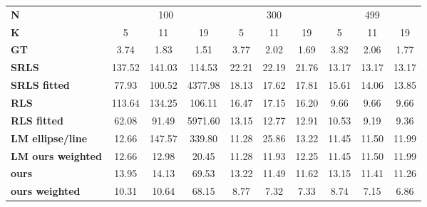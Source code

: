 \begin{tabular}{l|ccc|ccc|ccc|}
\toprule
\textbf{N} & \multicolumn{3}{c|}{100} & \multicolumn{3}{c|}{300} & \multicolumn{3}{c|}{499} \\
\textbf{K} &      5  &      11 &       19 &     5  &     11 &     19 &     5  &     11 &     19 \\
\midrule
\textbf{GT              } &    3.74 &    1.83 &     1.51 &   3.77 &   2.02 &   1.69 &   3.82 &   2.06 &   1.77 \\
\textbf{\midrule SRLS           } &  137.52 &  141.03 &   114.53 &  22.21 &  22.19 &  21.76 &  13.17 &  13.17 &  13.17 \\
\textbf{SRLS fitted     } &   77.93 &  100.52 &  4377.98 &  18.13 &  17.62 &  17.81 &  15.61 &  14.06 &  13.85 \\
\textbf{RLS             } &  113.64 &  134.25 &   106.11 &  16.47 &  17.15 &  16.20 &   \cellcolor{\secondcolor}9.66 &   \cellcolor{\secondcolor}9.66 &   \cellcolor{\secondcolor}9.66 \\
\textbf{RLS fitted      } &   62.08 &   91.49 &  5971.60 &  13.15 &  12.77 &  12.91 &  10.53 &   \cellcolor{\secondcolor}9.19 &   \cellcolor{\secondcolor}9.36 \\
\textbf{LM ellipse/line } &   \cellcolor{\secondcolor}12.66 &  147.57 &   339.80 &  \cellcolor{\secondcolor}11.28 &  25.86 &  13.22 &  11.45 &  11.50 &  11.99 \\
\textbf{LM ours weighted} &   \cellcolor{\secondcolor}12.66 &   \cellcolor{\secondcolor}12.98 &    \cellcolor{\firstcolor}20.45 &  \cellcolor{\secondcolor}11.28 &  11.93 &  12.25 &  11.45 &  11.50 &  11.99 \\
\textbf{ours            } &   13.95 &   14.13 &    69.53 &  13.22 &  \cellcolor{\secondcolor}11.49 &  \cellcolor{\secondcolor}11.62 &  13.15 &  11.41 &  11.26 \\
\textbf{ours weighted   } &   \cellcolor{\firstcolor}10.31 &   \cellcolor{\firstcolor}10.64 &    \cellcolor{\secondcolor}68.15 &   \cellcolor{\firstcolor}8.77 &   \cellcolor{\firstcolor}7.32 &   \cellcolor{\firstcolor}7.33 &   \cellcolor{\firstcolor}8.74 &   \cellcolor{\firstcolor}7.15 &   \cellcolor{\firstcolor}6.86 \\
\bottomrule
\end{tabular}
